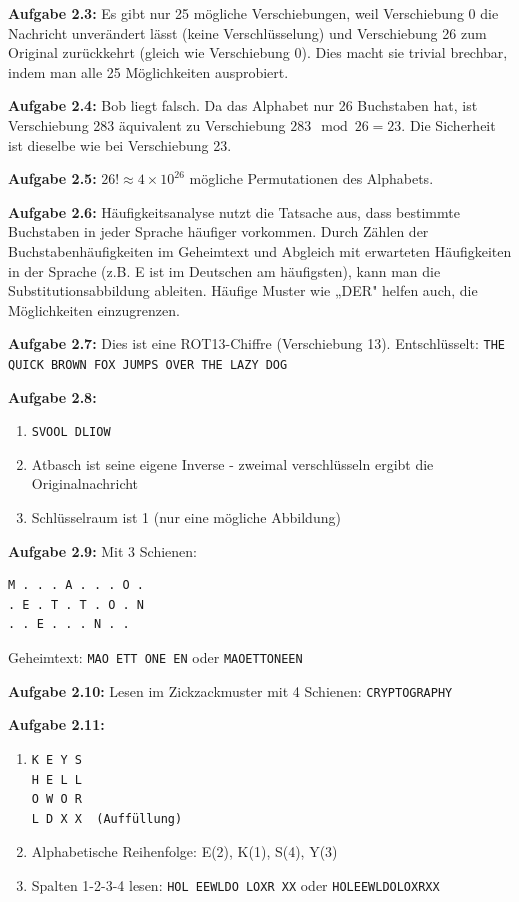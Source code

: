 \documentclass[11pt,a4paper]{report}
\begin{document}
\textbf{Aufgabe 2.3:}
Es gibt nur 25 mögliche Verschiebungen, weil Verschiebung 0 die Nachricht unverändert lässt (keine Verschlüsselung) und Verschiebung 26 zum Original zurückkehrt (gleich wie Verschiebung 0). Dies macht sie trivial brechbar, indem man alle 25 Möglichkeiten ausprobiert.

\textbf{Aufgabe 2.4:}
Bob liegt falsch. Da das Alphabet nur 26 Buchstaben hat, ist Verschiebung 283 äquivalent zu Verschiebung $283 \mod 26 = 23$. Die Sicherheit ist dieselbe wie bei Verschiebung 23.

\textbf{Aufgabe 2.5:}
$26! \approx 4 \times 10^{26}$ mögliche Permutationen des Alphabets.

\textbf{Aufgabe 2.6:}
Häufigkeitsanalyse nutzt die Tatsache aus, dass bestimmte Buchstaben in jeder Sprache häufiger vorkommen. Durch Zählen der Buchstabenhäufigkeiten im Geheimtext und Abgleich mit erwarteten Häufigkeiten in der Sprache (z.B. E ist im Deutschen am häufigsten), kann man die Substitutionsabbildung ableiten. Häufige Muster wie „DER" helfen auch, die Möglichkeiten einzugrenzen.

\textbf{Aufgabe 2.7:}
Dies ist eine ROT13-Chiffre (Verschiebung 13). Entschlüsselt: \texttt{THE QUICK BROWN FOX JUMPS OVER THE LAZY DOG}

\textbf{Aufgabe 2.8:}
\begin{enumerate}[label=\alph*)]
    \item \texttt{SVOOL DLIOW}
    \item Atbasch ist seine eigene Inverse - zweimal verschlüsseln ergibt die Originalnachricht
    \item Schlüsselraum ist 1 (nur eine mögliche Abbildung)
\end{enumerate}

\textbf{Aufgabe 2.9:}
Mit 3 Schienen:
\begin{verbatim}
M . . . A . . . O .
. E . T . T . O . N
. . E . . . N . .
\end{verbatim}
Geheimtext: \texttt{MAO ETT ONE EN} oder \texttt{MAOETTONEEN}

\textbf{Aufgabe 2.10:}
Lesen im Zickzackmuster mit 4 Schienen: \texttt{CRYPTOGRAPHY}

\textbf{Aufgabe 2.11:}
\begin{enumerate}[label=\alph*)]
    \item
\begin{verbatim}
K E Y S
H E L L
O W O R
L D X X  (Auffüllung)
\end{verbatim}
    \item Alphabetische Reihenfolge: E(2), K(1), S(4), Y(3)
    \item Spalten 1-2-3-4 lesen: \texttt{HOL EEWLDO LOXR XX} oder \texttt{HOLEEWLDOLOXRXX}
\end{enumerate}
\end{document}

